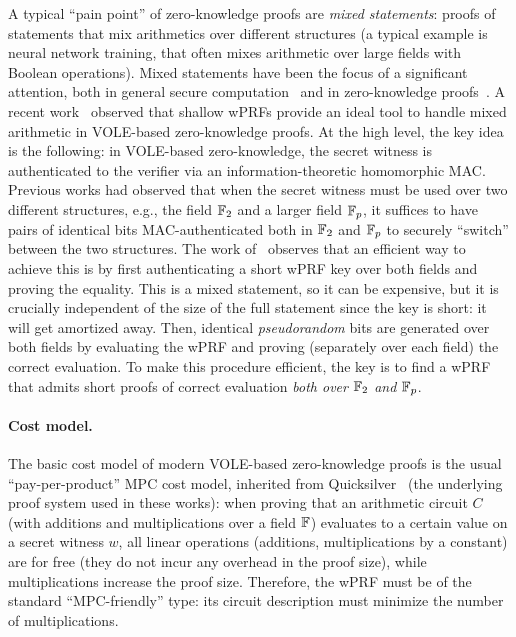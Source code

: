 A typical ``pain point'' of zero-knowledge proofs are \emph{mixed statements}: proofs of statements that mix arithmetics over different structures (a typical example is neural network training, that often mixes arithmetic over large fields with Boolean operations). Mixed statements have been the focus of a significant attention, both in general secure computation~\cite{NDSS:DemSchZoh15,SP:GYKW24,EC:BCGGIK21} and in zero-knowledge proofs~\cite{C:ChaGanMoh16,CCS:BBMRS21,EPRINT:OKMZ24,DBLP:conf/eurocrypt/AgarwalBBS25}. A recent work~\cite{DBLP:conf/eurocrypt/AgarwalBBS25} observed that shallow wPRFs provide an ideal tool to handle mixed arithmetic in VOLE-based zero-knowledge proofs. At the high level, the key idea is the following: in VOLE-based zero-knowledge, the secret witness is authenticated to the verifier via an information-theoretic homomorphic MAC. Previous works had observed that when the secret witness must be used over two different structures, e.g., the field $\mathbb{F}_2$ and a larger field $\mathbb{F}_p$, it suffices to have pairs of identical bits MAC-authenticated both in $\mathbb{F}_2$ and $\mathbb{F}_p$ to securely ``switch'' between the two structures. The work of~\cite{DBLP:conf/eurocrypt/AgarwalBBS25} observes that an efficient way to achieve this is by first authenticating a short wPRF key over both fields and proving the equality. This is a mixed statement, so it can be expensive, but it is crucially independent of the size of the full statement since the key is short: it will get amortized away. Then, identical \emph{pseudorandom} bits are generated over both fields by evaluating the wPRF and proving (separately over each field) the correct evaluation. To make this procedure efficient, the key is to find a wPRF that admits short proofs of correct evaluation \emph{both over $\mathbb{F}_2$ and $\mathbb{F}_p$}.

\paragraph{Cost model.} The basic cost model of modern VOLE-based zero-knowledge proofs is the usual ``pay-per-product'' MPC cost model, inherited from {\sf Quicksilver}~\cite{CCS:YSWW21} (the underlying proof system used in these works): when proving that an arithmetic circuit $C$ (with additions and multiplications over a field $\mathbb{F}$) evaluates to a certain value on a secret witness $w$, all linear operations (additions, multiplications by a constant) are for free (they do not incur any overhead in the proof size), while multiplications increase the proof size. Therefore, the wPRF must be of the standard ``MPC-friendly'' type: its circuit description must minimize the number of multiplications.

